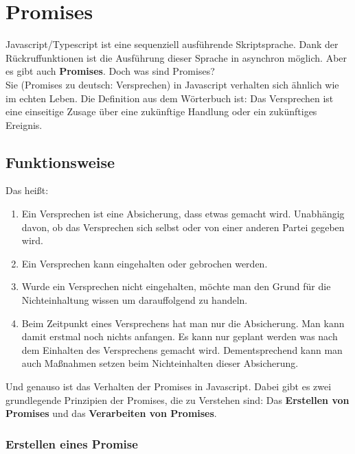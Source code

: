 \section{Promises}
Javascript/Typescript ist eine sequenziell ausführende Skriptsprache. Dank der Rückruffunktionen ist die Ausführung dieser Sprache in asynchron möglich. Aber es gibt auch \textbf{Promises}. Doch was sind Promises? \\

\noindent
Sie (\glqq{}Promises\grqq{} zu deutsch: Versprechen) in Javascript verhalten sich ähnlich wie im echten Leben. Die Definition aus dem Wörterbuch ist: Das Versprechen ist eine einseitige Zusage über eine zukünftige Handlung oder ein zukünftiges Ereignis. \cite{versprechen} \\

\subsection{Funktionsweise}
Das heißt:

\begin{enumerate}
    \item Ein Versprechen ist eine Absicherung, dass etwas gemacht wird. Unabhängig davon, ob das Versprechen sich selbst oder von einer anderen Partei gegeben wird.
    
    \item Ein Versprechen kann eingehalten oder gebrochen werden.
    
    \item Wurde ein Versprechen nicht eingehalten, möchte man den Grund für die Nichteinhaltung wissen um darauffolgend zu handeln.
    
    \item Beim Zeitpunkt eines Versprechens hat man nur die Absicherung. Man kann damit erstmal noch nichts anfangen. Es kann nur geplant werden was nach dem Einhalten des Versprechens gemacht wird. Dementsprechend kann man auch Maßnahmen setzen beim Nichteinhalten dieser Absicherung.
    
\end{enumerate}

Und genauso ist das Verhalten der Promises in Javascript. Dabei gibt es zwei grundlegende Prinzipien der Promises, die zu Verstehen sind: Das \textbf{Erstellen von Promises} und das \textbf{Verarbeiten von Promises}.

\subsubsection{Erstellen eines Promise}

